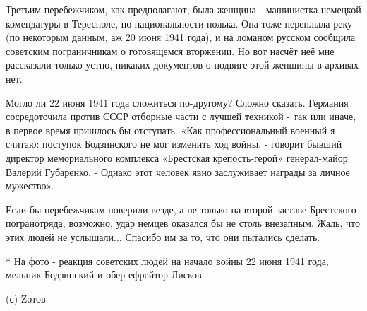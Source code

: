 Третьим перебежчиком, как предполагают, была женщина - машинистка немецкой
комендатуры в Тересполе, по национальности полька. Она тоже переплыла реку (по
некоторым данным, аж 20 июня 1941 года), и на ломаном русском сообщила
советским пограничникам о готовящемся вторжении. Но вот насчёт неё мне
рассказали только устно, никаких документов о подвиге этой женщины в архивах
нет. 

Могло ли 22 июня 1941 года сложиться по-другому? Сложно сказать. Германия
сосредоточила против СССР отборные части с лучшей техникой - так или иначе, в
первое время пришлось бы отступать. «Как профессиональный военный я считаю:
поступок Бодзинского не мог изменить ход войны, - говорит бывший директор
мемориального комплекса «Брестская крепость-герой» генерал-майор Валерий
Губаренко. - Однако этот человек явно заслуживает награды за личное мужество». 

Если бы перебежчикам поверили везде, а не только на второй заставе Брестского
погранотряда, возможно, удар немцев оказался бы не столь внезапным. Жаль, что
этих людей не услышали... Спасибо им за то, что они пытались сделать.

* На фото - реакция советских людей на начало войны 22 июня 1941 года, мельник Бодзинский и обер-ефрейтор Лисков.

(с) Zотов
